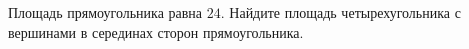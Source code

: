 \begin{ex}
	\begin{condition}
		Площадь прямоугольника равна \( 24\). Найдите площадь четырехугольника с вершинами в серединах сторон прямоугольника.
	\end{condition}
\end{ex}